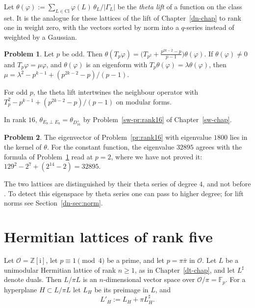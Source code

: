 \documentclass[reqno]{amsart}
\newcounter{chap}
\theoremstyle{definition}
\newtheorem{problem}{Problem}[section]
\theoremstyle{plain}
\newcommand{\Z}{\mathbb{Z}}
\newcommand{\F}{\mathbb{F}}
\newcommand{\ii}{\mathrm{i}}
\newcommand{\Oc}{\mathcal{O}}
\newcommand{\Cl}{\mathrm{Cl}}
\begin{document}
Let \(\theta(\varphi) := \sum_{L \in \Cl} \varphi(L)\, \theta_L / \lvert\Gamma_L\rvert\) be the \emph{theta lift} of a function on the class set.  It is the analogue for these lattices of the lift of Chapter~\ref{dn-chap} to rank one in weight zero, with the vectors sorted by norm into a \(q\)-series instead of weighted by a Gaussian.

\begin{problem}\label{pr:commute}
Let \(p\) be odd.  Then \(\theta(T_p\varphi) = \bigl(T_{p^2} + \frac{p^{2k-2} - p}{p-1}\bigr)\theta(\varphi)\).  If \(\theta(\varphi) \ne 0\) and \(T_p\varphi = \mu\varphi\), and \(\theta(\varphi)\) is an eigenform with \(T_p\theta(\varphi) = \lambda\theta(\varphi)\), then \(\mu = \lambda^2 - p^{k-1} + (p^{2k-2} - p)/(p-1)\).
\end{problem}

For odd \(p\), the theta lift intertwines the neighbour operator with \(T_p^2-p^{k-1}+(p^{2k-2}-p)/(p-1)\) on modular forms.

In rank \(16\), \(\theta_{E_8 \perp E_8} = \theta_{D_{16}^+}\) by Problem~\ref{sw-pr:rank16} of Chapter~\ref{sw-chap}.

\begin{problem}\label{pr:kernel16}
The eigenvector of Problem~\ref{pr:rank16} with eigenvalue \(1800\) lies in the kernel of \(\theta\).  For the constant function, the eigenvalue \(32895\) agrees with the formula of Problem~\ref{pr:commute} read at \(p = 2\), where we have not proved it: \(129^2 - 2^7 + (2^{14} - 2) = 32895\).
\end{problem}

The two lattices are distinguished by their theta series of degree \(4\), and not before \cite{CL}.  To detect this eigenspace by theta series one can pass to higher degree; for lift norms see Section~\ref{dn-sec:norm}.


\section{Hermitian lattices of rank five}\label{sec:hermitian}

Let \(\Oc = \Z[\ii]\), let \(p \equiv 1 \pmod 4\) be a prime, and let \(p = \pi\bar\pi\) in \(\Oc\).  Let \(L\) be a unimodular Hermitian lattice of rank \(n\ge1\), as in Chapter~\ref{dt-chap}, and let \(L^\sharp\) denote duals.  Then \(L/\pi L\) is an \(n\)-dimensional vector space over \(\Oc/\pi = \F_p\).  For a hyperplane \(H \subset L/\pi L\) let \(L_H\) be its preimage in \(L\), and
\[
  L'_H := L_H + \pi L_H^\sharp .
\]
\end{document}
